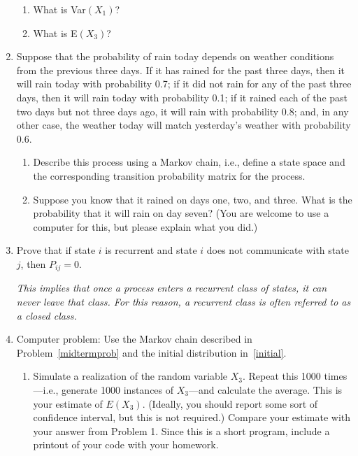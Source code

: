 \documentclass{article}
\begin{document}
\begin{enumerate}
\begin{enumerate}
    \item What is Var$(X_1)$?

    \item What is E$(X_3)$?  %

  \end{enumerate} 

  \item Suppose that the probability of rain today depends on weather
  conditions from the previous three days. If it has rained for the
  past three days, then it will rain today with probability 0.7; if it
  did not rain for any of the past three days, then it will rain today
  with probability 0.1; if it rained each of the past two days but not three days
  ago, it will rain with probability 0.8; and, in any other case, the weather today will
  match yesterday's weather with probability 0.6.

  \begin{enumerate}
  
  \item Describe this process using a Markov chain, i.e., define a state space
  and the corresponding transition probability matrix for the process.

  \item Suppose you know that it rained on days one, two, and three. What is the
  probability that it will rain on day seven? (You are welcome to use a computer
  for this, but please explain what you did.)

  \end{enumerate}

  \item Prove that if state $i$ is recurrent and state $i$ does not communicate
  with state $j$, then $P_{ij}=0$.

  {\em This implies that once a process enters a recurrent class of states, it
  can never leave that class. For this reason, a recurrent class is often
  referred to as a {\em closed} class.}

  \item Computer problem: Use the Markov chain described in Problem~\ref{midtermprob}
  and the initial distribution in~\ref{initial}.

  \begin{enumerate}

    \item Simulate a realization of the random variable $X_3$. Repeat this 1000
    times---i.e., generate 1000 instances of $X_3$---and calculate the average.
    This is your estimate of $E(X_3)$. (Ideally, you should report some sort of
    confidence interval, but this is not required.) Compare your estimate with
    your answer from Problem 1. Since this is a short program, include a
    printout of your code with your homework.
  

\end{enumerate}
\end{enumerate}
\end{document}
